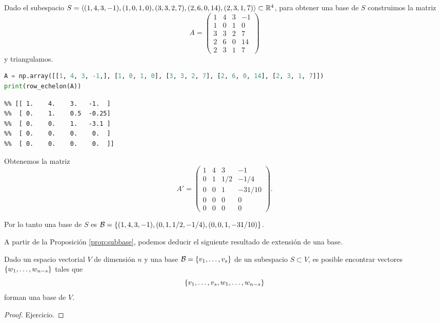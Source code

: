 \begin{ejemplo}
Dado el subespacio $S = \langle( 1,  4,  3, -1), (1,  0,  1,  0), (3,  3,  2,  7), (2,  6,  0, 14),( 2,  3,  1,  7)\rangle \subset \mathbb R^4$, para obtener una base de $S$ construimos la matriz
$$
A =
\begin{pmatrix}
 1 & 4 & 3 & -1 \\
 1 & 0 & 1 &  0 \\
 3 & 3 & 2 &  7 \\
 2 & 6 & 0 & 14 \\
 2 & 3 & 1 &  7
\end{pmatrix}
$$
y triangulamos.

\begin{Shaded}
\begin{lstlisting}[language=Python]
A = np.array([[1, 4, 3, -1,], [1, 0, 1, 0], [3, 3, 2, 7], [2, 6, 0, 14], [2, 3, 1, 7]])
print(row_echelon(A))
\end{lstlisting}
\end{Shaded}

\begin{verbatim}
%% [[ 1.    4.    3.   -1.  ]
%%  [ 0.    1.    0.5  -0.25]
%%  [ 0.    0.    1.   -3.1 ]
%%  [ 0.    0.    0.    0.  ]
%%  [ 0.    0.    0.    0.  ]]
\end{verbatim}

Obtenemos la matriz
$$
A' =
\begin{pmatrix}
 1 & 4 & 3 & -1 \\
 0 & 1 & 1/2 &  -1/4 \\
 0 & 0 & 1 &  -31/10 \\
 0 & 0 & 0 & 0 \\
 0 & 0 & 0 & 0
\end{pmatrix}.
$$

Por lo tanto una base de $S$ es $\mathcal B = \{(1, 4, 3, -1), (0, 1, 1/2, -1/4), (0, 0, 1, -31/10)\}$.
\end{ejemplo}

A partir de la Proposici\'on \ref{prop:subbase}, podemos deducir el siguiente resultado de extensión de una base.

\begin{proposicion}
\label{prop:extension}
Dado un espacio vectorial $V$ de dimensión $n$ y una base $\B = \{\vb_1, \dots, \vb_s\}$ de un subespacio $S \subset V$, es posible encontrar vectores $\{\wb_1, \dots, \wb_{n-s}\}$ tales que
$$
\{\vb_1, \dots, \vb_s, \wb_1, \dots, \wb_{n-s}\}
$$
forman una base de $V$.
\end{proposicion}
\begin{proof} Ejercicio.
\end{proof}

